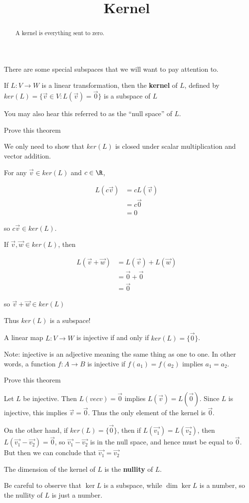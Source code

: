 \documentclass{ximera}
\title{Kernel}
\begin{document}
\begin{abstract}
	A kernel is everything sent to zero.
\end{abstract}

There are some special subspaces that we will want to pay attention to.

\begin{theorem}
	If $L:V \to W$ is a linear transformation, then the \textbf{kernel} of $L$, defined by $ker(L) = \{\vec{v} \in V:L(\vec{v}) = \vec{0}\}$ is a subspace of $L$
\end{theorem}

You may also hear this referred to as the ``null space'' of $L$.

Prove this theorem

\begin{free-response}
We only need to show that $ker(L)$ is closed under scalar multiplication and vector addition.

For any $\vec{v} \in ker(L)$ and $c \in \R$,

\begin{align*}
	L(c\vec{v}) &=cL(\vec{v})\\
		&=c\vec{0}\\
		&=0
\end{align*}

so $c\vec{v} \in ker(L)$.

If $\vec{v},\vec{w} \in ker(L)$, then

\begin{align*}
	L(\vec{v}+\vec{w}) &= L(\vec{v})+L(\vec{w})\\
	&= \vec{0}+\vec{0}\\
	&=\vec{0}
\end{align*}

so $\vec{v}+\vec{w} \in ker(L)$

Thus $ker(L)$ is a subspace!

\end{free-response}

\begin{theorem}
	A linear map $L:V \to W$ is injective if and only if $ker(L) = \{\vec{0}\}$.
\end{theorem}

Note:  injective is an adjective meaning the same thing as one to one.  In other words, a function $f:A \to B$ is injective if $f(a_1)=f(a_2)$ implies $a_1=a_2$.

Prove this theorem
	
\begin{free-response}
	Let $L$ be injective.  Then $L(vec{v}) = \vec{0}$ implies $L(\vec{v}) = L(\vec{0})$.  Since $L$ is injective, this implies $\vec{v} = \vec{0}$.  Thus the only element
	of the kernel is $\vec{0}$.
	
	On the other hand, if $ker(L) = \{\vec{0}\}$, then if $L(\vec{v_1}) = L(\vec{v_2})$, then $L(\vec{v_1}-\vec{v_2})= \vec{0}$, so $\vec{v_1}-\vec{v_2}$
	 is in the null space, and hence must be equal to $\vec{0}$.  But then we can conclude that $\vec{v_1} = \vec{v_2}$
	\end{free-response}

\begin{definition}
  The dimension of the kernel of $L$ is the \textbf{nullity} of $L$.        
\end{definition}

Be careful to observe that $\ker L$ is a subspace, while $\dim \ker L$
is a number, so the nullity of $L$ is just a number.
\end{document}
